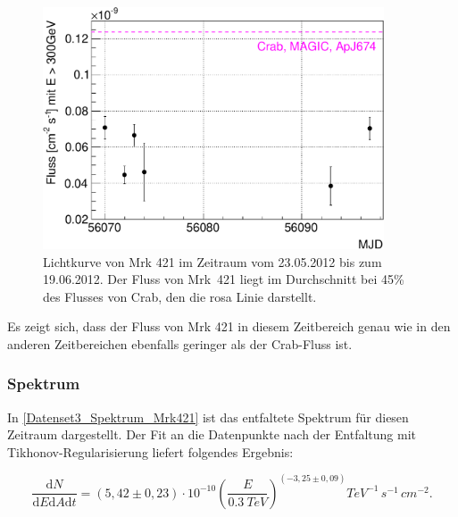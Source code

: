 \begin{figure}
    \centering
    \includegraphics[width=0.9\textwidth]{./Plots/04_MrkAnalyse/Datenset3/Datenset3_Mrk421_LC.pdf}
    \caption{Lichtkurve von Mrk 421 im Zeitraum vom 23.05.2012 bis zum 19.06.2012.
    Der Fluss von Mrk~421 liegt im Durchschnitt bei 45\% des Flusses von Crab, den die rosa Linie darstellt.}
    \label{Datenset3_LC_Mrk421}
\end{figure}

Es zeigt sich, dass der Fluss von Mrk 421 in diesem Zeitbereich genau wie in den anderen Zeitbereichen ebenfalls geringer als der Crab-Fluss ist.


\subsubsection{Spektrum}

In \autoref{Datenset3_Spektrum_Mrk421} ist das entfaltete Spektrum für diesen Zeitraum dargestellt.
Der Fit an die Datenpunkte nach der Entfaltung mit Tikhonov-Regularisierung liefert folgendes Ergebnis:

\begin{equation}
 \frac{\mathrm{d}N}{\mathrm{d}E\mathrm{d}A\mathrm{d}t}=(5,42 \pm 0,23) \cdot 10^{-10}\left( \frac{E}{\SI{0,3}{TeV}} \right)^{(-3,25 \pm 0,09)} \si{TeV^{-1}\,s^{-1}\,cm^{-2}}.
\end{equation}

